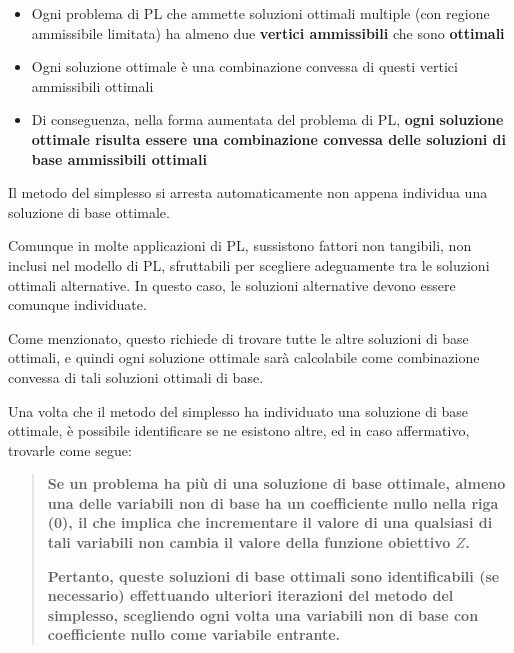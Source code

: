 \begin{itemize}
    \item Ogni problema di PL che ammette soluzioni ottimali multiple (con regione ammissibile limitata) ha almeno due \textbf{vertici ammissibili} che sono \textbf{ottimali}
    \item Ogni soluzione ottimale è una combinazione convessa di questi vertici ammissibili ottimali
    \item Di conseguenza, nella forma aumentata del problema di PL, \textbf{ogni soluzione ottimale risulta essere una combinazione convessa delle soluzioni di base ammissibili ottimali}
\end{itemize}

Il metodo del simplesso si arresta automaticamente non appena individua una soluzione di base ottimale.

Comunque in molte applicazioni di PL, sussistono fattori non tangibili, non inclusi nel modello di PL, sfruttabili per scegliere adeguamente tra le soluzioni ottimali alternative. In questo caso, le soluzioni alternative devono essere comunque individuate.

Come menzionato, questo richiede di trovare tutte le altre soluzioni di base ottimali, e quindi ogni soluzione ottimale sarà calcolabile come combinazione convessa di tali soluzioni ottimali di base.

Una volta che il metodo del simplesso ha individuato una soluzione di base ottimale, è possibile identificare se ne esistono altre, ed in caso affermativo, trovarle come segue:

\begin{quote}
\textbf{Se un problema ha più di una soluzione di base ottimale, almeno una delle variabili non di base ha un coefficiente nullo nella riga (0), il che implica che incrementare il valore di una qualsiasi di tali variabili non cambia il valore della funzione obiettivo $Z$.}

\textbf{Pertanto, queste soluzioni di base ottimali sono identificabili (se necessario) effettuando ulteriori iterazioni del metodo del simplesso, scegliendo ogni volta una variabili non di base con coefficiente nullo come variabile entrante.}
\end{quote}

\vspace{0.5cm}

